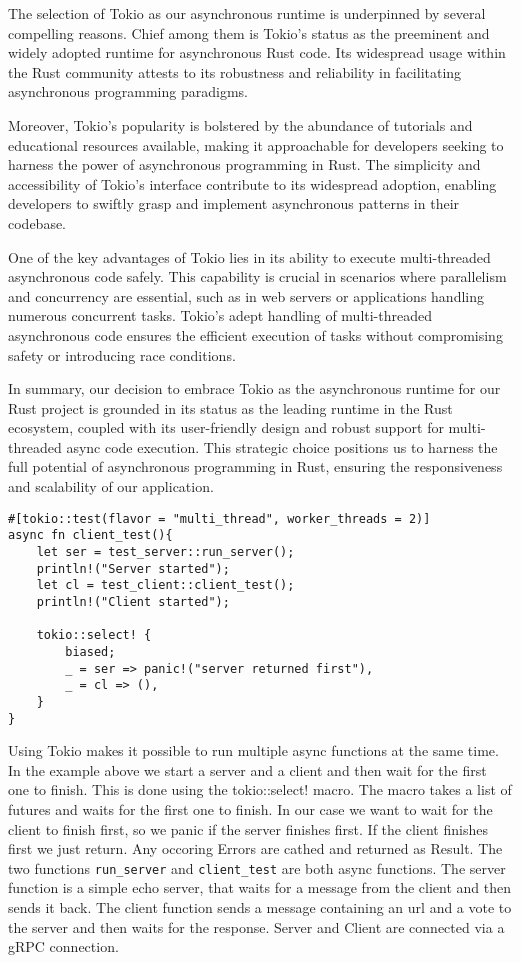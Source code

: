 The selection of Tokio as our asynchronous runtime is underpinned by several compelling reasons. Chief among them is Tokio's status as the preeminent and widely
adopted runtime for asynchronous Rust code. Its widespread usage within the Rust community attests to its robustness and reliability in facilitating asynchronous
programming paradigms.\newline

Moreover, Tokio's popularity is bolstered by the abundance of tutorials and educational resources available, making it approachable for developers seeking to 
harness the power of asynchronous programming in Rust. The simplicity and accessibility of Tokio's interface contribute to its widespread adoption, enabling 
developers to swiftly grasp and implement asynchronous patterns in their codebase.\newline

One of the key advantages of Tokio lies in its ability to execute multi-threaded asynchronous code safely. This capability is crucial in scenarios where 
parallelism and concurrency are essential, such as in web servers or applications handling numerous concurrent tasks. Tokio's adept handling of multi-threaded 
asynchronous code ensures the efficient execution of tasks without compromising safety or introducing race conditions.\newline


In summary, our decision to embrace Tokio as the asynchronous runtime for our Rust project is grounded in its status as the leading runtime in the Rust 
ecosystem, coupled with its user-friendly design and robust support for multi-threaded async code execution. This strategic choice positions us to harness the 
full potential of asynchronous programming in Rust, ensuring the responsiveness and scalability of our application.

\begin{verbatim}
#[tokio::test(flavor = "multi_thread", worker_threads = 2)]
async fn client_test(){ 
    let ser = test_server::run_server();
    println!("Server started");
    let cl = test_client::client_test();
    println!("Client started");

    tokio::select! {
        biased; 
        _ = ser => panic!("server returned first"),
        _ = cl => (),
    }           
}
\end{verbatim}

Using Tokio makes it possible to run multiple async functions at the same time. In the example above we start a server and a client and then wait for the first one to finish. 
This is done using the tokio::select! macro. The macro takes a list of futures and waits for the first one to finish. In our case we want to wait for the client to finish 
first, so we panic if the server finishes first. If the client finishes first we just return. Any occoring Errors are cathed and returned as Result.
The two functions \verb+run_server+ and \verb+client_test+ are both async functions. The server function is a simple echo server, that waits for a message from the client and 
then sends it back. The client function sends a message containing an url and a vote to the server and then waits for the response. Server and Client are connected via a gRPC 
connection. 

